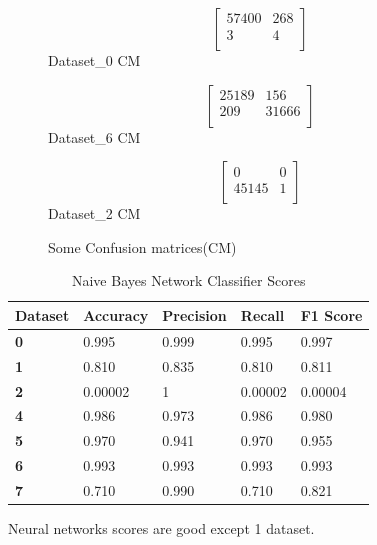 \documentclass[submission,copyright,creativecommons]{eptcs}
\begin{document}
\begin{figure}[h!]
\begin{minipage}{.3\linewidth}
    \centering
    \[\left[\begin{array}{cc}
      57400 & 268\\
      3 & 4\\
    \end{array}\right]\]
    Dataset\_0 CM
  \end{minipage} 
  \begin{minipage}{.3\linewidth}
    \centering
    \[\left[\begin{array}{cc}
      25189 & 156\\
      209 & 31666\\
    \end{array}\right]\]
    Dataset\_6 CM
  \end{minipage} 
  \begin{minipage}{.3\linewidth}
    \centering
    \[\left[\begin{array}{cc}
      0 & 0\\
      45145 & 1\\
    \end{array}\right]\]
    Dataset\_2 CM
  \end{minipage}
  \caption{Some Confusion matrices(CM)}
  \end{figure}
  \begin{table}[H]
  \begin{center}
\begin{tabular}{|l|l|l|l|l|}
\hline
\textbf{Dataset}  & \textbf{Accuracy} & \textbf{Precision} & \textbf{Recall} & \textbf{F1 Score} \\ \hline
\textbf{0} & 0.995             & 0.999              & 0.995           & 0.997             \\ \hline
\textbf{1} & 0.810             & 0.835              & 0.810           & 0.811             \\ \hline
\textbf{2} & 0.00002           & 1                  & 0.00002         & 0.00004           \\ \hline
\textbf{4} & 0.986             & 0.973              & 0.986           & 0.980             \\ \hline
\textbf{5} & 0.970             & 0.941              & 0.970           & 0.955             \\ \hline
\textbf{6} & 0.993             & 0.993              & 0.993           & 0.993             \\ \hline
\textbf{7} & 0.710             & 0.990              & 0.710           & 0.821             \\ \hline
\end{tabular}
\caption{Naive Bayes Network Classifier Scores}
\label{tab:my-table}
\end{center}
\end{table}
Neural networks scores are good except 1 dataset.
\end{document}
